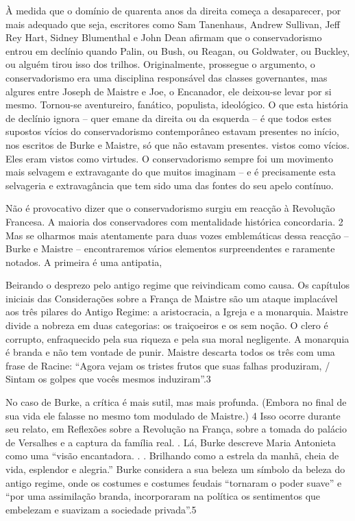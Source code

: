  \par 
À medida que o domínio de quarenta anos da direita começa a desaparecer, por mais adequado que seja, escritores como Sam Tanenhaus, Andrew Sullivan, Jeff Rey Hart, Sidney Blumenthal e John Dean afirmam que o conservadorismo entrou em declínio quando Palin, ou Bush, ou Reagan, ou Goldwater, ou Buckley, ou alguém tirou isso dos trilhos. Originalmente, prossegue o argumento, o conservadorismo era uma disciplina responsável das classes governantes, mas algures entre Joseph de Maistre e Joe, o Encanador, ele deixou-se levar por si mesmo. Tornou-se aventureiro, fanático, populista, ideológico. O que esta história de declínio ignora – quer emane da direita ou da esquerda – é que todos estes supostos vícios do conservadorismo contemporâneo estavam presentes no início, nos escritos de Burke e Maistre, só que não estavam presentes. vistos como vícios. Eles eram vistos como virtudes. O conservadorismo sempre foi um movimento mais selvagem e extravagante do que muitos imaginam – e é precisamente esta selvageria e extravagância que tem sido uma das fontes do seu apelo contínuo.
 \par 
Não é provocativo dizer que o conservadorismo surgiu em reacção à Revolução Francesa. A maioria dos conservadores com mentalidade histórica concordaria. {\color{blue}2} Mas se olharmos mais atentamente para duas vozes emblemáticas dessa reacção – Burke e Maistre – encontraremos vários elementos surpreendentes e raramente notados. A primeira é uma antipatia,
 \par 
Beirando o desprezo pelo antigo regime que reivindicam como causa. Os capítulos iniciais das Considerações sobre a França de Maistre são um ataque implacável aos três pilares do Antigo Regime: a aristocracia, a Igreja e a monarquia. Maistre divide a nobreza em duas categorias: os traiçoeiros e os sem noção. O clero é corrupto, enfraquecido pela sua riqueza e pela sua moral negligente. A monarquia é branda e não tem vontade de punir. Maistre descarta todos os três com uma frase de Racine: “Agora vejam os tristes frutos que suas falhas produziram, / Sintam os golpes que vocês mesmos induziram”.{\color{blue}3}
 \par 
No caso de Burke, a crítica é mais sutil, mas mais profunda. (Embora no final de sua vida ele falasse no mesmo tom modulado de Maistre.) {\color{blue}4} Isso ocorre durante seu relato, em Reflexões sobre a Revolução na França, sobre a tomada do palácio de Versalhes e a captura da família real. . Lá, Burke descreve Maria Antonieta como uma “visão encantadora. . . Brilhando como a estrela da manhã, cheia de vida, esplendor e alegria.” Burke considera a sua beleza um símbolo da beleza do antigo regime, onde os costumes e costumes feudais “tornaram o poder suave” e “por uma assimilação branda, incorporaram na política os sentimentos que embelezam e suavizam a sociedade privada”.{\color{blue}5}
